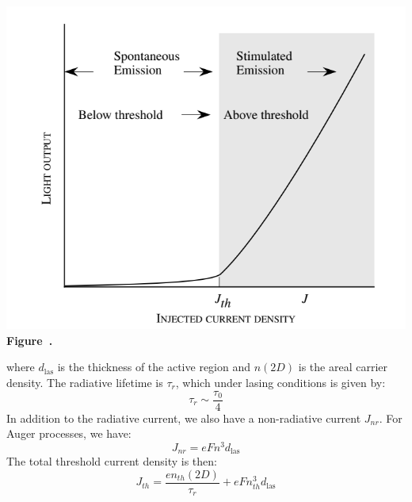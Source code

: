 \begin{center}
	\begin{minipage}{0.80\textwidth}
		\centering
		\includegraphics[width=\textwidth]{img/J_Thr.png}
		\\[0.5em]
		\textbf{Figure~\thefigure.}
		\label{fig:J_Thr}
	\end{minipage}
\end{center}
where \( d_{\text{las}} \) is the thickness of the active region and \( n(2D) \) is the areal carrier density.
The radiative lifetime is \( \tau_r \), which under lasing conditions is given by:
\begin{equation}
	\tau_r \sim \frac{\tau_0}{4}
\end{equation}
In addition to the radiative current, we also have a non-radiative current \( J_{nr} \). For Auger processes, we have:
\begin{equation}
	J_{nr} = e F n^3 d_{\text{las}}
\end{equation}
The total threshold current density is then:
\begin{equation}
	J_{th} = \frac{e n_{th}(2D)}{\tau_r} + e F n_{th}^3 d_{\text{las}}
\end{equation}
